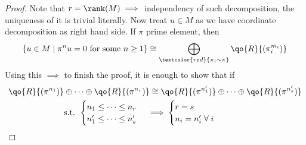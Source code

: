 \begin{proof}
	Note that \( r = \rank(M) \implies \) independency of such decomposition, the uniqueness of it is
	trivial literally. Now treat \( u \in M \) as we have coordinate decomposition as right hand side. If \( \pi \) prime
	element, then
	\[
		\{u \in M \; | \; \pi^n u = 0 \text{ for some } n \geq 1\} \cong \bigoplus_{\textcolor{red}{\pi_i \sim \pi}}
		\qo{R}{(\pi_i^{m_i})}
	\]
	Using this \( \implies \) to finish the proof, it is enough to show that if
	\[
		\begin{aligned}
			\qo{R}{(\pi^{n_1})} & \oplus \cdots \oplus \qo{R}{(\pi^{n_r})}  \cong \qo{R}{(\pi^{n'_1})}
			\oplus \cdots \oplus \qo{R}{(\pi^{n'_s})}                                                  \\
			                    & \text{s.t. }
			\begin{cases}
				n_1\leq \cdots \leq n_r \\
				n'_1 \leq \cdots \leq n'_s
			\end{cases}
			\implies
			\begin{cases}
				r = s \\
				n_i = n'_i \; \forall \; i
			\end{cases}
		\end{aligned}
	\]
\end{proof}

